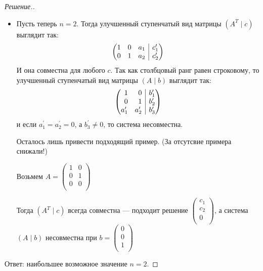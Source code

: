 \documentclass[a4paper]{article}
\makeatletter
\theoremstyle{remark}
\newenvironment{sysmatrix}[1]
{
    \left(\begin{array}{@{}#1@{}}
}
{\end{array}\right)}
\newcommand{\smt}[2]{\begin{sysmatrix}{#1} #2\end{sysmatrix}}
\makeatother
\begin{document}
\begin{proof}[Решение.]
\begin{itemize}
                \item Пусть теперь $n = 2$. Тогда улучшенный ступенчатый вид матрицы 
                $(A^T \mid c)$ выглядит так:
                \[\smt{rrr|r} {
                    1 & 0 & a_1 & c_1^{\prime} \\
                    0 & 1 & a_2 & c_2^{\prime} \\
                }\]
                И она совместна для любого $c$. Так как столбцовый ранг равен строковому, то 
                улучшенный ступенчатый вид матрицы 
                $(A \mid b)$ выглядит так:
                \[\smt{rr|r} {
                    1 & 0 & b_1^{\prime} \\
                    0 & 1 & b_2^{\prime} \\
                    a_1^\prime & a_2^\prime & b_3^{\prime} \\
                }\]
                и если $a_1^\prime = a_2^\prime = 0$, а $b_3^{\prime} \neq 0$, то 
                система несовместна. 

                Осталось лишь привести подходящий пример. (За отсутсвие примера снижали!)

                Возьмем $A = 
                \begin{pmatrix}
                    1 & 0 \\ 
                    0 & 1  \\ 
                    0 & 0 \\ 
                \end{pmatrix} $
                
                Тогда $(A^T \mid c)$ всегда совместна --- подходит решение 
                $\begin{pmatrix}
                    c_1 \\ 
                    c_2 \\ 
                    0 \\ 
                \end{pmatrix}$, а система $(A \mid b)$ несовместна при $b = 
                \begin{pmatrix}
                    0 \\ 
                    0 \\ 
                    1 \\ 
                \end{pmatrix}$
            \end{itemize}

            Ответ: наибольшее возможное значение $n = 2$.
        \end{proof}	 
    
\end{document}
